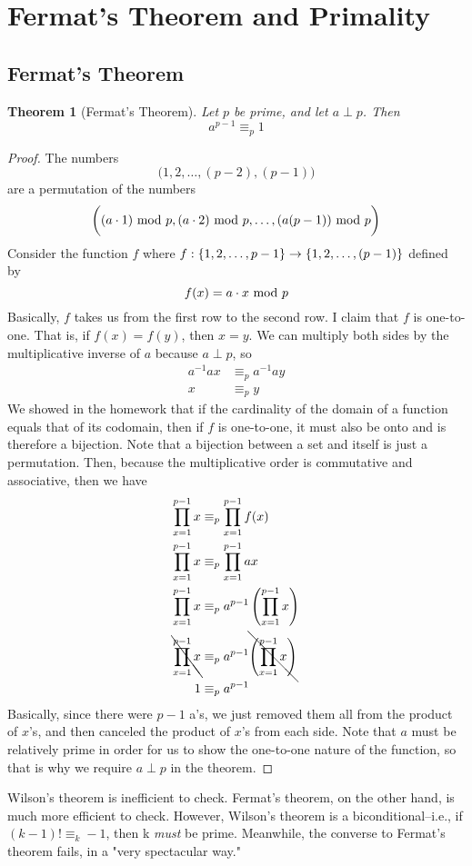 \documentclass[10pt]{article}
\newtheorem{theorem}{Theorem}[section]
\theoremstyle{definition}
\begin{document}
\section{Fermat's Theorem and Primality}
\subsection{Fermat's Theorem}
\begin{theorem}[Fermat's Theorem]
Let $p$ be prime, and let $a\perp p$.  Then 
\[a^{p-1} \equiv_p 1\]
\end{theorem}
\begin{proof}
The numbers
\[\bigg(1,2,\ldots,(p-2),(p-1)\bigg)\]
are a permutation of the numbers 
\[\bigg((a\cdot 1) \textnormal{~mod~} p, (a\cdot 2)\textnormal{~mod~} p, \ldots, (a(p-1))\textnormal{~mod~} p\bigg)\]
Consider the function $f$ where $f:\{ 1,2,\ldots,p-1 \} \rightarrow \{ 1,2,\ldots,(p-1) \}$ defined by 
\[ f(x) = a\cdot x \textnormal{~mod~} p\] 
Basically, $f$ takes us from the first row to the second row.  I claim that $f$ is one-to-one.  That is, if $f(x) = f(y)$, then $x=y$.  We can multiply both sides by the multiplicative inverse of $a$ because $a\perp p$, so 
\begin{align*}
a^{-1} a x &\equiv_p a^{-1} a y \\ 
x &\equiv_p y 
\end{align*}
We showed in the homework that if the cardinality of the domain of a function equals that of its codomain, then if $f$ is one-to-one, it must also be onto and is therefore a bijection.  Note that a bijection between a set and itself is just a permutation. Then, because the multiplicative order is commutative and associative, then we have 
\begin{align*}
\prod_{x=1}^{p-1}x &\equiv_p \prod_{x=1}^{p-1} f(x) \\ 
\prod_{x=1}^{p-1}x &\equiv_p \prod_{x=1}^{p-1} ax \\ 
\prod_{x=1}^{p-1}x &\equiv_p a^{p-1} \left(\prod_{x=1}^{p-1} x\right) \\ 
\bcancel{\prod_{x=1}^{p-1} x }&\equiv_p a^{p-1} \bcancel{\left(\prod_{x=1}^{p-1} x \right)} \\ 
1 &\equiv_p a^{p-1} 
\end{align*} 
Basically, since there were $p-1$ a's, we just removed them all from the product of $x$'s, and then canceled the product of $x$'s from each side.  Note that $a$ must be relatively prime in order for us to show the one-to-one nature of the function, so that is why we require $a\perp p$ in the theorem.  
\end{proof}
Wilson's theorem is inefficient to check.  Fermat's theorem, on the other hand, is much more efficient to check.  However, Wilson's theorem is a biconditional--i.e., if $(k-1)! \equiv_k -1$, then k \textit{must} be prime.  Meanwhile, the converse to Fermat's theorem fails, in a "very spectacular way."  
\end{document}
